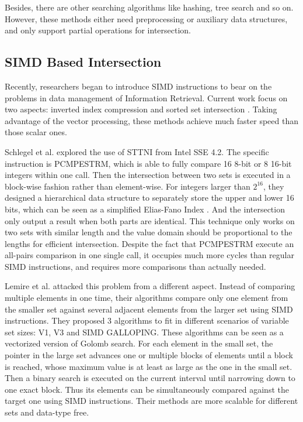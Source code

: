 \documentclass[runningheads,a4paper]{llncs}
\begin{document}
Besides, there are other searching algorithms like hashing, tree search and so on.
However, these methods either need preprocessing or auxiliary data structures, and only support partial operations for intersection.
\subsection{SIMD Based Intersection}
Recently, researchers began to introduce SIMD instructions to bear on the problems in data management of Information Retrieval.
Current work focus on two aspects: inverted index compression \cite{lemire2015decoding,stepanov2011simd,trotman2014compression} and sorted set intersection \cite{lemire2016simd,Inoue2014Faster,Schlegel2011Fast}.
Taking advantage of the vector processing, these methods achieve much faster speed than those scalar ones.

Schlegel et al. \cite{Schlegel2011Fast} explored the use of STTNI from Intel SSE 4.2.
The specific instruction is \textsf{PCMPESTRM}, which is able to fully compare 16 8-bit or 8 16-bit integers within one call.
Then the intersection between two sets is executed in a block-wise fashion rather than element-wise.
For integers larger than $ 2^{16} $, they designed a hierarchical data structure to separately store the upper and lower 16 bits, which can be seen as a simplified Elias-Fano Index \cite{ottaviano2014partitioned,vigna2013quasi}.
And the intersection only output a result when both parts are identical.
This technique only works on two sets with similar length and the value domain should be proportional to the lengths for efficient intersection.
Despite the fact that \textsf{PCMPESTRM} execute an all-pairs comparison in one single call, it occupies much more cycles than regular SIMD instructions, and requires more comparisons than actually needed.

Lemire et al. \cite{lemire2016simd} attacked this problem from a different aspect.
Instead of comparing multiple elements in one time, their algorithms compare only one element from the smaller set against several adjacent elements from the larger set using SIMD instructions.
They proposed 3 algorithms to fit in different scenarios of variable set sizes: V1, V3 and SIMD GALLOPING.
These algorithms can be seen as a vectorized version of Golomb search.
For each element in the small set, the pointer in the large set advances one or multiple blocks of elements until a block is reached, whose maximum value is at least as large as the one in the small set.
Then a binary search is executed on the current interval until narrowing down to one exact block.
Thus its elements can be simultaneously compared against the target one using SIMD instructions.
Their methods are more scalable for different sets and data-type free.
\end{document}
